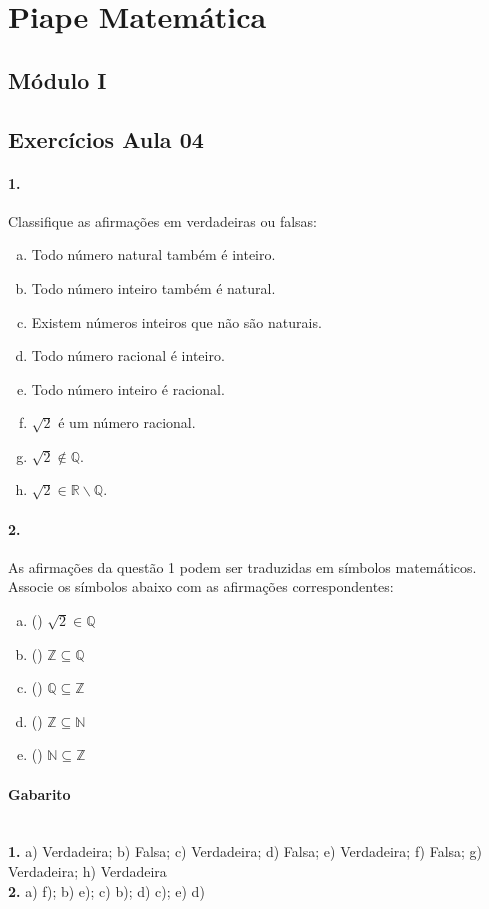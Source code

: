\documentclass[a4paper,twocolumn,12pt]{article}
\begin{document}
 
\section*{Piape Matemática} 
 
\subsection*{Módulo I}
\subsection*{Exercícios Aula 04}

\paragraph{1.} Classifique as afirmações em verdadeiras ou falsas:
\begin{enumerate}[a)]
\item Todo número natural também é inteiro. 
\item Todo número inteiro também é natural.  
\item Existem números inteiros que não são naturais.
\item Todo número racional é inteiro. 
\item Todo número inteiro é racional.
\item $\sqrt{2}$ é um número racional.
\item $\sqrt{2} \notin \mathbb{Q}$.
\item $\sqrt{2} \in \mathbb{R\backslash Q}$.
\end{enumerate}


\paragraph*{2. } As afirmações da questão 1 podem ser traduzidas em símbolos matemáticos. Associe os símbolos abaixo com as afirmações correspondentes:
\begin{enumerate}[a)]
  \item (\hspace{7mm}) $\sqrt{2} \in \mathbb{Q}$ 
  \item (\hspace{7mm}) $\mathbb{Z} \subseteq \mathbb{Q}$
  \item (\hspace{7mm}) $\mathbb{Q} \subseteq \mathbb{Z}$
  \item (\hspace{7mm}) $\mathbb{Z} \subseteq \mathbb{N}$
  \item (\hspace{7mm}) $\mathbb{N} \subseteq \mathbb{Z}$
\end{enumerate}


\vfill

{\footnotesize
\paragraph*{Gabarito} \hspace*{\fill}\\
\textbf{1.} a) Verdadeira; b) Falsa; c) Verdadeira; d) Falsa; e) Verdadeira; f) Falsa; g) Verdadeira; h) Verdadeira\\ 
\textbf{2.} a) f); b) e); c) b); d) c); e) d)\\
}
\end{document}
